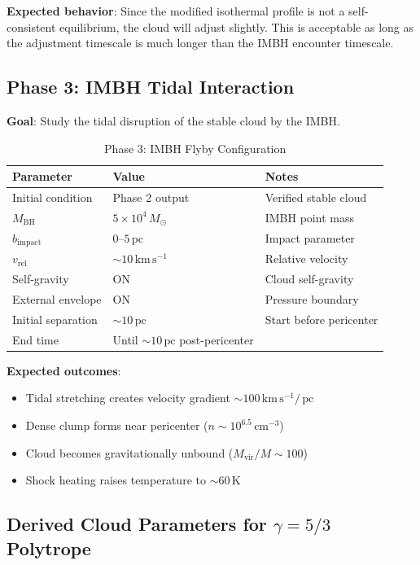 \documentclass[11pt,a4paper]{article}
\newcommand{\Msun}{M_\odot}
\newcommand{\kms}{\,\mathrm{km\,s^{-1}}}
\newcommand{\pc}{\,\mathrm{pc}}
\newcommand{\cmcubed}{\,\mathrm{cm^{-3}}}
\begin{document}
\textbf{Expected behavior}: Since the modified isothermal profile is not a
self-consistent equilibrium, the cloud will adjust slightly. This is acceptable
as long as the adjustment timescale is much longer than the IMBH encounter
timescale.

\subsection{Phase 3: IMBH Tidal Interaction}

\textbf{Goal}: Study the tidal disruption of the stable cloud by the IMBH.

\begin{table}[h]
\centering
\caption{Phase 3: IMBH Flyby Configuration}
\begin{tabular}{lll}
\toprule
\textbf{Parameter} & \textbf{Value} & \textbf{Notes} \\
\midrule
Initial condition & Phase 2 output & Verified stable cloud \\
$M_\mathrm{BH}$ & $5 \times 10^4\,\Msun$ & IMBH point mass \\
$b_\mathrm{impact}$ & $0$--$5\pc$ & Impact parameter \\
$v_\mathrm{rel}$ & $\sim 10\kms$ & Relative velocity \\
Self-gravity & ON & Cloud self-gravity \\
External envelope & ON & Pressure boundary \\
\midrule
Initial separation & $\sim 10\pc$ & Start before pericenter \\
End time & Until $\sim 10\pc$ post-pericenter & \\
\bottomrule
\end{tabular}
\end{table}

\textbf{Expected outcomes}:
\begin{itemize}
    \item Tidal stretching creates velocity gradient $\sim 100\kms/\pc$
    \item Dense clump forms near pericenter ($n \sim 10^{6.5}\cmcubed$)
    \item Cloud becomes gravitationally unbound ($M_\mathrm{vir}/M \sim 100$)
    \item Shock heating raises temperature to $\sim 60\,\mathrm{K}$
\end{itemize}

\subsection{Derived Cloud Parameters for $\gamma = 5/3$ Polytrope}
\end{document}

